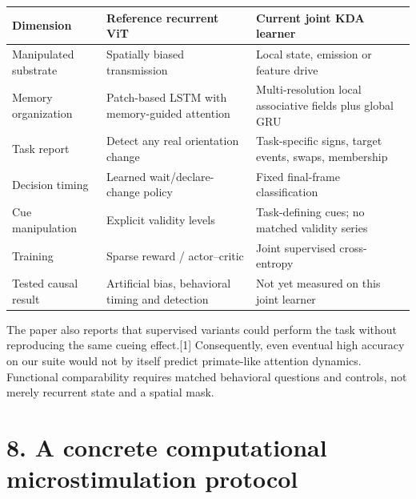 \documentclass[
  10pt,
]{article}
\newcounter{none} %
\begin{document}
{\def\LTcaptype{none} %
\begin{longtable}[]{@{}
  >{\raggedright\arraybackslash}p{}
  >{\raggedright\arraybackslash}p{}
  >{\raggedright\arraybackslash}p{}@{}}
\toprule\noalign{}
\begin{minipage}[b]{\linewidth}\raggedright
Dimension
\end{minipage} & \begin{minipage}[b]{\linewidth}\raggedright
Reference recurrent ViT
\end{minipage} & \begin{minipage}[b]{\linewidth}\raggedright
Current joint KDA learner
\end{minipage} \\
\midrule\noalign{}
\endhead
\bottomrule\noalign{}
\endlastfoot
Manipulated substrate & Spatially biased transmission & Local state,
emission or feature drive \\
Memory organization & Patch-based LSTM with memory-guided attention &
Multi-resolution local associative fields plus global GRU \\
Task report & Detect any real orientation change & Task-specific signs,
target events, swaps, membership \\
Decision timing & Learned wait/declare-change policy & Fixed final-frame
classification \\
Cue manipulation & Explicit validity levels & Task-defining cues; no
matched validity series \\
Training & Sparse reward / actor--critic & Joint supervised
cross-entropy \\
Tested causal result & Artificial bias, behavioral timing and detection
& Not yet measured on this joint learner \\
\end{longtable}
}

The paper also reports that supervised variants could perform the task
without reproducing the same cueing effect.{[}1{]} Consequently, even
eventual high accuracy on our suite would not by itself predict
primate-like attention dynamics. Functional comparability requires
matched behavioral questions and controls, not merely recurrent state
and a spatial mask.

\newpage

\section{8. A concrete computational microstimulation
protocol}\label{a-concrete-computational-microstimulation-protocol}
\end{document}
